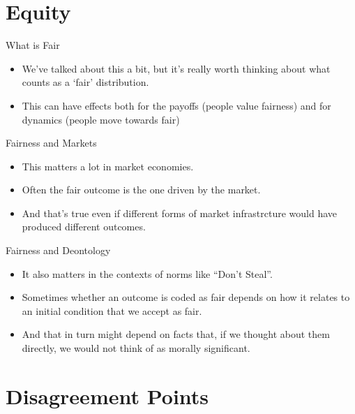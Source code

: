 \documentclass[
  ignorenonframetext,
]{beamer}
\providecommand{\tightlist}{%
  \setlength{\itemsep}{0pt}\setlength{\parskip}{0pt}}
\begin{document}
\hypertarget{equity}{%
\section{Equity}\label{equity}}

\begin{frame}{What is Fair}
\protect\hypertarget{what-is-fair}{}
\begin{itemize}
\tightlist
\item
  We've talked about this a bit, but it's really worth thinking about
  what counts as a `fair' distribution.
\item
  This can have effects both for the payoffs (people value fairness) and
  for dynamics (people move towards fair)
\end{itemize}
\end{frame}

\begin{frame}{Fairness and Markets}
\protect\hypertarget{fairness-and-markets}{}
\begin{itemize}
\tightlist
\item
  This matters a lot in market economies.
\item
  Often the fair outcome is the one driven by the market.
\item
  And that's true even if different forms of market infrastrcture would
  have produced different outcomes.
\end{itemize}
\end{frame}

\begin{frame}{Fairness and Deontology}
\protect\hypertarget{fairness-and-deontology}{}
\begin{itemize}
\tightlist
\item
  It also matters in the contexts of norms like ``Don't Steal''.
\item
  Sometimes whether an outcome is coded as fair depends on how it
  relates to an initial condition that we accept as fair.
\item
  And that in turn might depend on facts that, if we thought about them
  directly, we would not think of as morally significant.
\end{itemize}
\end{frame}

\hypertarget{disagreement-points}{%
\section{Disagreement Points}\label{disagreement-points}}
\end{document}
